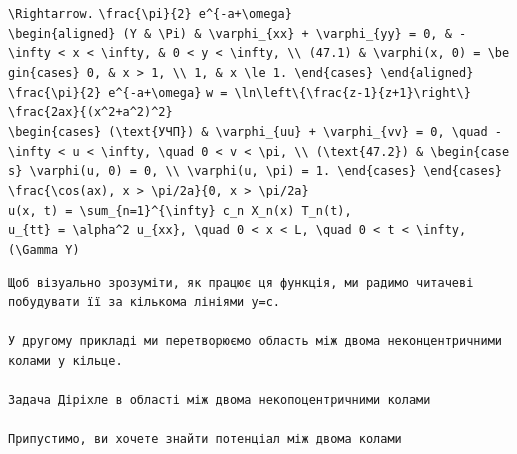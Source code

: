 \documentclass[
  ukrainian,
]{article}
\begin{document}
\texttt{\textbackslash{}Rightarrow.}
\texttt{\textbackslash{}frac\{\textbackslash{}pi\}\{2\}\ e\^{}\{-a+\textbackslash{}omega\}}
\texttt{\textbackslash{}begin\{aligned\}\ (Y\ \&\ \textbackslash{}Pi)\ \&\ \textbackslash{}varphi\_\{xx\}\ +\ \textbackslash{}varphi\_\{yy\}\ =\ 0,\ \&\ -\textbackslash{}infty\ \textless{}\ x\ \textless{}\ \textbackslash{}infty,\ \&\ 0\ \textless{}\ y\ \textless{}\ \textbackslash{}infty,\ \textbackslash{}\textbackslash{}\ (47.1)\ \&\ \textbackslash{}varphi(x,\ 0)\ =\ \textbackslash{}begin\{cases\}\ 0,\ \&\ \textbar{}x\textbar{}\ \textgreater{}\ 1,\ \textbackslash{}\textbackslash{}\ 1,\ \&\ \textbar{}x\textbar{}\ \textbackslash{}le\ 1.\ \textbackslash{}end\{cases\}\ \textbackslash{}end\{aligned\}}
\texttt{\textbackslash{}frac\{\textbackslash{}pi\}\{2\}\ e\^{}\{-a+\textbackslash{}omega\}}
\texttt{w\ =\ \textbackslash{}ln\textbackslash{}left\textbackslash{}\{\textbackslash{}frac\{z-1\}\{z+1\}\textbackslash{}right\textbackslash{}\}}
\texttt{\textbackslash{}frac\{2ax\}\{(x\^{}2+a\^{}2)\^{}2\}}
\texttt{\textbackslash{}begin\{cases\}\ (\textbackslash{}text\{УЧП\})\ \&\ \textbackslash{}varphi\_\{uu\}\ +\ \textbackslash{}varphi\_\{vv\}\ =\ 0,\ \textbackslash{}quad\ -\textbackslash{}infty\ \textless{}\ u\ \textless{}\ \textbackslash{}infty,\ \textbackslash{}quad\ 0\ \textless{}\ v\ \textless{}\ \textbackslash{}pi,\ \textbackslash{}\textbackslash{}\ (\textbackslash{}text\{47.2\})\ \&\ \textbackslash{}begin\{cases\}\ \textbackslash{}varphi(u,\ 0)\ =\ 0,\ \textbackslash{}\textbackslash{}\ \textbackslash{}varphi(u,\ \textbackslash{}pi)\ =\ 1.\ \textbackslash{}end\{cases\}\ \textbackslash{}end\{cases\}}
\texttt{\textbackslash{}frac\{\textbackslash{}cos(ax),\ \textbar{}x\textbar{}\ \textgreater{}\ \textbackslash{}pi/2a\}\{0,\ \textbar{}x\textbar{}\ \textgreater{}\ \textbackslash{}pi/2a\}}
\texttt{u(x,\ t)\ =\ \textbackslash{}sum\_\{n=1\}\^{}\{\textbackslash{}infty\}\ c\_n\ X\_n(x)\ T\_n(t),}
\texttt{u\_\{tt\}\ =\ \textbackslash{}alpha\^{}2\ u\_\{xx\},\ \textbackslash{}quad\ 0\ \textless{}\ x\ \textless{}\ L,\ \textbackslash{}quad\ 0\ \textless{}\ t\ \textless{}\ \textbackslash{}infty,}
\texttt{(\textbackslash{}Gamma\ Y)}

\begin{verbatim}
Щоб візуально зрозуміти, як працює ця функція, ми радимо читачеві побудувати її за кількома лініями y=c.

У другому прикладі ми перетворюємо область між двома неконцентричними колами у кільце.

Задача Діріхле в області між двома некопоцентричними колами

Припустимо, ви хочете знайти потенціал між двома колами
\end{verbatim}
\end{document}
